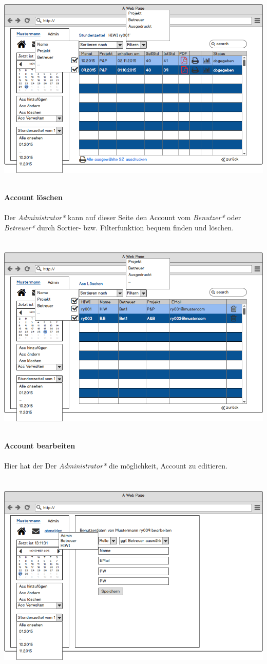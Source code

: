 \includegraphics[width=\linewidth]{UI/Admin/EinBenutzer.png}

\newpage
\textbf{\\Account löschen}\\
\\
Der \emph{Administrator*} kann auf dieser Seite den Account vom \emph{Benutzer*} oder \emph{Betreuer*} durch Sortier- bzw. Filterfunktion bequem finden und löschen.\\
\\
\\
\includegraphics[width=\linewidth]{UI/Admin/Accounts/Ubersicht.png}



\newpage
\textbf{\\Account bearbeiten}\\
\\
Hier hat der Der \emph{Administrator*} die möglichkeit, Account zu editieren.\\
\\
\\
\includegraphics[width=\linewidth]{UI/Admin/Accounts/Bearbeiten.png}
